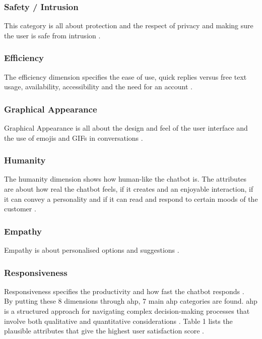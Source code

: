 \subsubsection{Safety / Intrusion}
This category is all about protection and the respect of privacy and making sure the user is safe from intrusion \citep*{Muizzah2021, Verkeyn2018}.\\

\subsubsection{Efficiency}
The efficiency dimension specifies the ease of use, quick replies versus free text usage, availability, accessibility and the need for an account \citep*{Muizzah2021, Verkeyn2018}.\\

\subsubsection{Graphical Appearance}
Graphical Appearance is all about the design and feel of the user interface and the use of emojis and GIFs in conversations \citep*{Muizzah2021, Verkeyn2018}.\\

\subsubsection{Humanity}
The humanity dimension shows how human-like the chatbot is. The attributes are about how real the chatbot feels, if it creates and an enjoyable interaction, if it can convey a personality and if it can read and respond to certain moods of the customer \citep*{Muizzah2021, Verkeyn2018}.\\

\subsubsection{Empathy}
Empathy is about personalised options and suggestions \citep*{Muizzah2021, Verkeyn2018}.\\

\subsubsection{Responsiveness}
Responsiveness specifies the productivity and how fast the chatbot responds \citep*{Muizzah2021, Verkeyn2018}.\\
\break
By putting these 8 dimensions through \acrfull{ahp}, 7 main \acrshort{ahp} categories are found. \acrshort{ahp} is a structured approach for navigating complex decision-making processes that involve both qualitative and quantitative considerations \citep{Radziwil2021}. Table 1 lists the plausible attributes that give the highest user satisfaction score \citep{Muizzah2021}.\\

